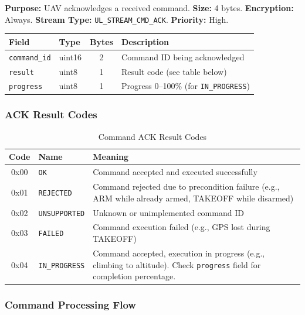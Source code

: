 \documentclass[11pt,a4paper]{article}
\begin{document}
\textbf{Purpose:} UAV acknowledges a received command. \textbf{Size:} 4 bytes. \textbf{Encryption:} Always. \textbf{Stream Type:} \texttt{UL\_STREAM\_CMD\_ACK}. \textbf{Priority:} High.

\begin{table}[H]
\centering
\begin{tabular}{@{}llcl@{}}
\toprule
\textbf{Field} & \textbf{Type} & \textbf{Bytes} & \textbf{Description} \\
\midrule
\texttt{command\_id} & uint16 & 2 & Command ID being acknowledged \\
\texttt{result}      & uint8  & 1 & Result code (see table below) \\
\texttt{progress}    & uint8  & 1 & Progress 0--100\% (for \texttt{IN\_PROGRESS}) \\
\bottomrule
\end{tabular}
\end{table}

\subsubsection{ACK Result Codes}

\begin{table}[H]
\centering
\begin{tabular}{@{}clp{8cm}@{}}
\toprule
\textbf{Code} & \textbf{Name} & \textbf{Meaning} \\
\midrule
0x00 & \texttt{OK}          & Command accepted and executed successfully \\
0x01 & \texttt{REJECTED}    & Command rejected due to precondition failure (e.g., ARM while already armed, TAKEOFF while disarmed) \\
0x02 & \texttt{UNSUPPORTED} & Unknown or unimplemented command ID \\
0x03 & \texttt{FAILED}      & Command execution failed (e.g., GPS lost during TAKEOFF) \\
0x04 & \texttt{IN\_PROGRESS} & Command accepted, execution in progress (e.g., climbing to altitude). Check \texttt{progress} field for completion percentage. \\
\bottomrule
\end{tabular}
\caption{Command ACK Result Codes}
\end{table}

\subsubsection{Command Processing Flow}
\end{document}
